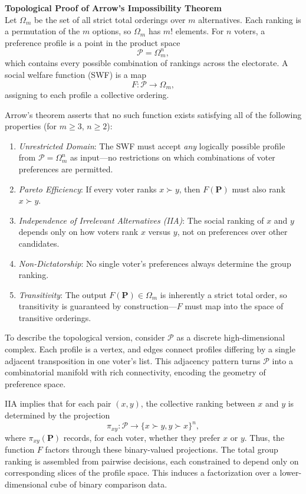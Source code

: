 \begin{technical}
{\Large\textbf{Topological Proof of Arrow's Impossibility Theorem}}\\[0.3em]

Let \(\Omega_m\) be the set of all strict total orderings over \(m\) alternatives. Each ranking is a permutation of the \(m\) options, so \(\Omega_m\) has \(m!\) elements. For \(n\) voters, a preference profile is a point in the product space
\[
\mathcal{P} = \Omega_m^n,
\]
which contains every possible combination of rankings across the electorate. A social welfare function (SWF) is a map
\[
F : \mathcal{P} \to \Omega_m,
\]
assigning to each profile a collective ordering. 

Arrow's theorem asserts that no such function exists satisfying all of the following properties (for \(m \geq 3\), \(n \geq 2\)):

\begin{enumerate}
    \item \textit{Unrestricted Domain}: The SWF must accept \emph{any} logically possible profile from \(\mathcal{P} = \Omega_m^n\) as input—no restrictions on which combinations of voter preferences are permitted.
    \item \textit{Pareto Efficiency}: If every voter ranks \(x \succ y\), then \(F(\mathbf{P})\) must also rank \(x \succ y\).
    \item \textit{Independence of Irrelevant Alternatives (IIA)}: The social ranking of \(x\) and \(y\) depends only on how voters rank \(x\) versus \(y\), not on preferences over other candidates.
    \item \textit{Non-Dictatorship}: No single voter's preferences always determine the group ranking.
    \item \textit{Transitivity}: The output \(F(\mathbf{P}) \in \Omega_m\) is inherently a strict total order, so transitivity is guaranteed by construction—\(F\) must map into the space of transitive orderings.
\end{enumerate}

To describe the topological version, consider \(\mathcal{P}\) as a discrete high-dimensional complex. Each profile is a vertex, and edges connect profiles differing by a single adjacent transposition in one voter’s list. This adjacency pattern turns \(\mathcal{P}\) into a combinatorial manifold with rich connectivity, encoding the geometry of preference space.

IIA implies that for each pair \((x,y)\), the collective ranking between \(x\) and \(y\) is determined by the projection
\[
\pi_{xy} : \mathcal{P} \to \{ \text{$x \succ y$}, \text{$y \succ x$} \}^n,
\]
where \(\pi_{xy}(\mathbf{P})\) records, for each voter, whether they prefer \(x\) or \(y\). Thus, the function \(F\) factors through these binary-valued projections. The total group ranking is assembled from pairwise decisions, each constrained to depend only on corresponding slices of the profile space. This induces a factorization over a lower-dimensional cube of binary comparison data.


\end{technical}
